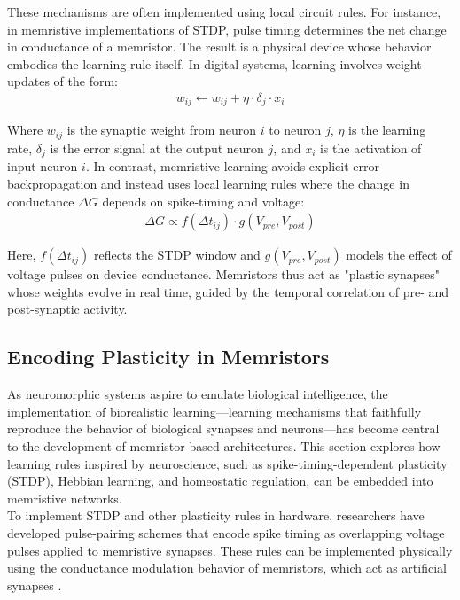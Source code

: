 \noindent These mechanisms are often implemented using local circuit rules. For instance, in memristive implementations of STDP, pulse timing determines the net change in conductance of a memristor. The result is a physical device whose behavior embodies the learning rule itself. In digital systems, learning involves weight updates of the form:
\begin{align}
    w_{ij} \leftarrow w_{ij} + \eta \cdot \delta_j \cdot x_i \label{eq:2.32} 
\end{align}

\noindent Where $w_{ij}$ is the synaptic weight from neuron $i$ to neuron $j$, $\eta$ is the learning rate, $\delta_j$ is the error signal at the output neuron $j$, and $x_i$ is the activation of input neuron $i$. In contrast, memristive learning avoids explicit error backpropagation and instead uses local learning rules where the change in conductance $\Delta G$ depends on spike-timing and voltage:
\begin{align}
    \Delta G \varpropto f(\Delta t_{ij}) \cdot g(V_{pre}, V_{post}) \label{eq:2.33}
\end{align}

\noindent Here, $f(\Delta t_{ij})$ reflects the STDP window and $g(V_{pre}, V_{post})$ models the effect of voltage pulses on device conductance. Memristors thus act as "plastic synapses" whose weights evolve in real time, guided by the temporal correlation of pre- and post-synaptic activity.

\subsection[Encoding Plasticity in Memristors]{Encoding Plasticity in Memristors}

As neuromorphic systems aspire to emulate biological intelligence, the implementation of biorealistic learning—learning mechanisms that faithfully reproduce the behavior of biological synapses and neurons—has become central to the development of memristor-based architectures. This section explores how learning rules inspired by neuroscience, such as spike-timing-dependent plasticity (STDP), Hebbian learning, and homeostatic regulation, can be embedded into memristive networks.\\

\noindent To implement STDP and other plasticity rules in hardware, researchers have developed pulse-pairing schemes that encode spike timing as overlapping voltage pulses applied to memristive synapses. These rules can be implemented physically using the conductance modulation behavior of memristors, which act as artificial synapses \cite{campbell2016pulse}. \\

